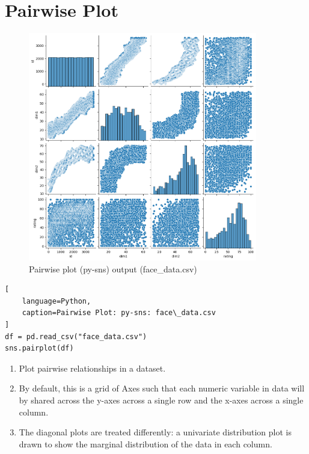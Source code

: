 \section{Pairwise Plot \cite{statistics/book/Statistics-for-Data-Scientists/Maurits-Kaptein, data/online/seaborn.pairplot}} \label{Visualizing Data/Pairwise Plot}


\begin{table}[H]
\begin{minipage}[t]{0.35\linewidth}
\begin{figure}[H]
    \centering
    \includegraphics[width=0.9\linewidth, height=10cm, keepaspectratio]{images/data/__visualizations__/sns-pairplot-face-data.png}
    \caption{Pairwise plot (py-sns) output (face\_data.csv)}
\end{figure}
\end{minipage}
\hspace{0.2cm}
\vrule width 1pt
\hspace{0.5cm}
\begin{minipage}[t]{0.57\linewidth}
\begin{lstlisting}[
    language=Python,
    caption=Pairwise Plot: py-sns: face\_data.csv
]
df = pd.read_csv("face_data.csv")
sns.pairplot(df)
\end{lstlisting}

\vspace{0.3cm}

\begin{enumerate}
    \item Plot pairwise relationships in a dataset. \hfill \cite{data/online/seaborn.pairplot}

    \item By default, this is a grid of Axes such that each numeric variable in data will by shared across the y-axes across a single row and the x-axes across a single column. \hfill \cite{data/online/seaborn.pairplot}
    
    \item The diagonal plots are treated differently: a univariate distribution plot is drawn to show the marginal distribution of the data in each column. \hfill \cite{data/online/seaborn.pairplot}
\end{enumerate}
\end{minipage}
\end{table}









